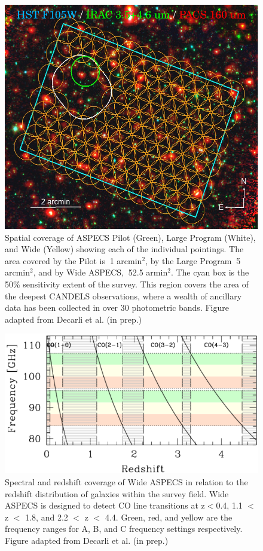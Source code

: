 \begin{figure}[!htbp]
\centering \includegraphics[width=120mm]{Wide_ASPECS_Coverage.png}
\caption{Spatial coverage of ASPECS Pilot (Green), Large Program (White), and Wide (Yellow) showing each of the individual pointings. The area covered by the Pilot is $~$1 arcmin$^2$, by the Large Program $~$5 arcmin$^2$, and by Wide ASPECS, $~$52.5 armin$^2$. The cyan box is the 50\% sensitivity extent of the survey. This region covers the area of the deepest CANDELS observations, where a wealth of ancillary data has been collected in over 30 photometric bands. Figure adapted from Decarli et al. (in prep.)} %
\label{fig:ASPECS_Coverage}
\end{figure}

\begin{figure}[!htbp]
\centering
\includegraphics[width=120mm]{Wide_ASPECS_Freq.png}
\caption{Spectral and redshift coverage of Wide ASPECS in relation to the redshift distribution of galaxies within the survey field. Wide ASPECS is designed to detect CO line transitions at z$<$0.4, 1.1 $<$ z $<$ 1.8, and 2.2 $<$ z $<$ 4.4. Green, red, and yellow are the frequency ranges for A, B, and C frequency settings respectively. Figure adapted from Decarli et al. (in prep.)}
\label{fig:ASPECS_Freq}
\end{figure}

